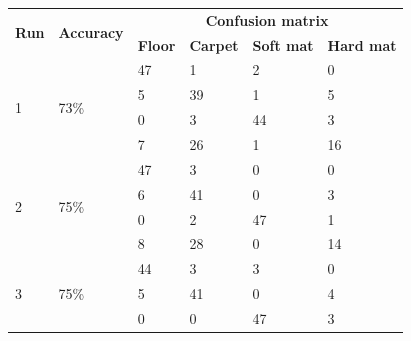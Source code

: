 \documentclass[USenglish]{ifimaster}  %
\begin{document}
	\begin{table}[h]
		\centering
		\begin{tabular}{@{}llllll@{}}
			\toprule
			\multirow{2}{*}{\textbf{Run}} & \multirow{2}{*}{\textbf{Accuracy}} & \multicolumn{4}{c}{\textbf{Confusion matrix}} \\ \cmidrule(l){3-6} 
			&  & \multicolumn{1}{l|}{\textbf{Floor}} & \multicolumn{1}{l|}{\textbf{Carpet}} & \multicolumn{1}{l|}{\textbf{Soft mat}} & \textbf{Hard mat} \\ \midrule
			\multicolumn{1}{l|}{\multirow{4}{*}{1}} & \multicolumn{1}{l|}{\multirow{4}{*}{73\%}} & \multicolumn{1}{l|}{47} & \multicolumn{1}{l|}{1} & \multicolumn{1}{l|}{2} & 0 \\ \cmidrule(l){3-6} 
			\multicolumn{1}{l|}{} & \multicolumn{1}{l|}{} & \multicolumn{1}{l|}{5} & \multicolumn{1}{l|}{39} & \multicolumn{1}{l|}{1} & 5 \\ \cmidrule(l){3-6} 
			\multicolumn{1}{l|}{} & \multicolumn{1}{l|}{} & \multicolumn{1}{l|}{0} & \multicolumn{1}{l|}{3} & \multicolumn{1}{l|}{44} & 3 \\ \cmidrule(l){3-6} 
			\multicolumn{1}{l|}{} & \multicolumn{1}{l|}{} & \multicolumn{1}{l|}{7} & \multicolumn{1}{l|}{26} & \multicolumn{1}{l|}{1} & 16 \\ \midrule
			\multicolumn{1}{l|}{\multirow{4}{*}{2}} & \multicolumn{1}{l|}{\multirow{4}{*}{75\%}} & \multicolumn{1}{l|}{47} & \multicolumn{1}{l|}{3} & \multicolumn{1}{l|}{0} & 0 \\ \cmidrule(l){3-6} 
			\multicolumn{1}{l|}{} & \multicolumn{1}{l|}{} & \multicolumn{1}{l|}{6} & \multicolumn{1}{l|}{41} & \multicolumn{1}{l|}{0} & 3 \\ \cmidrule(l){3-6} 
			\multicolumn{1}{l|}{} & \multicolumn{1}{l|}{} & \multicolumn{1}{l|}{0} & \multicolumn{1}{l|}{2} & \multicolumn{1}{l|}{47} & 1 \\ \cmidrule(l){3-6} 
			\multicolumn{1}{l|}{} & \multicolumn{1}{l|}{} & \multicolumn{1}{l|}{8} & \multicolumn{1}{l|}{28} & \multicolumn{1}{l|}{0} & 14 \\ \midrule
			\multicolumn{1}{l|}{\multirow{4}{*}{3}} & \multicolumn{1}{l|}{\multirow{4}{*}{75\%}} & \multicolumn{1}{l|}{44} & \multicolumn{1}{l|}{3} & \multicolumn{1}{l|}{3} & 0 \\ \cmidrule(l){3-6} 
			\multicolumn{1}{l|}{} & \multicolumn{1}{l|}{} & \multicolumn{1}{l|}{5} & \multicolumn{1}{l|}{41} & \multicolumn{1}{l|}{0} & 4 \\ \cmidrule(l){3-6} 
			\multicolumn{1}{l|}{} & \multicolumn{1}{l|}{} & \multicolumn{1}{l|}{0} & \multicolumn{1}{l|}{0} & \multicolumn{1}{l|}{47} & 3 \\ \cmidrule(l){3-6} 

\end{tabular}
\end{table}
\end{document}

